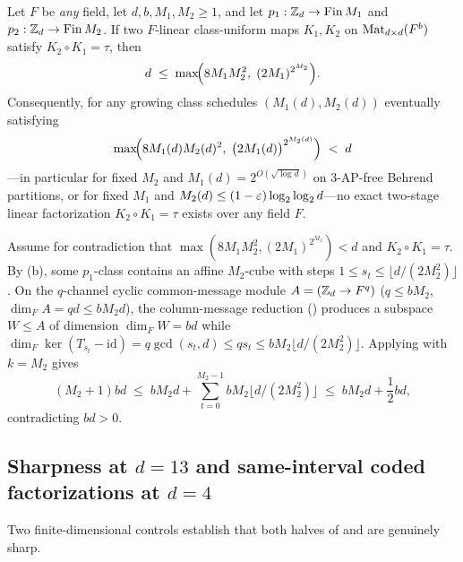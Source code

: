 \begin{theorem}\label{thm:2a}
Let $F$ be \emph{any} field, let $d, b, M_1, M_2 \ge 1$, and let
$p_1 : \mathbb{Z}_d \to \mathrm{Fin}\,M_1$ and $p_2 : \mathbb{Z}_d \to \mathrm{Fin}\,M_2$. If two $F$-linear
class-uniform maps $K_1, K_2$ on $\operatorname{Mat}_{d\times d}(F^b)$ satisfy $K_2 \circ K_1 = \tau$, then
\[
  d \;\le\; \max\!\Bigl(8 M_1 M_2^2,\; (2 M_1)^{2^{M_2}}\Bigr).
\]
Consequently, for any growing class schedules $(M_1(d), M_2(d))$ eventually satisfying
\[
  \max\!\Bigl(8 M_1(d) M_2(d)^2,\; \bigl(2 M_1(d)\bigr)^{2^{M_2(d)}}\Bigr) \;<\; d
\]
---in particular for fixed $M_2$
and $M_1(d) = 2^{O(\sqrt{\log d})}$ on $3$-AP-free Behrend partitions, or for fixed $M_1$ and
$M_2(d) \le (1 - \varepsilon)\log_2\log_2 d$---no exact two-stage linear factorization $K_2 \circ K_1 =
\tau$ exists over any field $F$.
\end{theorem}
\begin{outline}
Assume for contradiction that $\max(8M_1 M_2^2, (2M_1)^{2^{M_2}}) < d$ and $K_2 \circ K_1 = \tau$.
By (b), some $p_1$-class contains an affine $M_2$-cube with steps
$1 \le s_t \le \lfloor d/(2M_2^2)\rfloor$. On the $q$-channel cyclic common-message module
$A = (\mathbb{Z}_d \to F^q)$ ($q \le b M_2$, $\dim_F A = qd \le b M_2 d$), the column-message reduction
(\cite[Lemma~6.1 and Theorem~6.3]{SharedDecoders2026}) produces a subspace $W \le A$ of dimension
$\dim_F W = bd$
while $\dim_F\ker(T_{s_t} - \mathrm{id}) = q\gcd(s_t, d) \le q s_t \le b M_2 \lfloor d/(2M_2^2)\rfloor$.
Applying  with $k = M_2$ gives
\[
  (M_2 + 1) bd \;\le\; b M_2 d + \sum_{t=0}^{M_2 - 1} b M_2 \lfloor d/(2 M_2^2)\rfloor
  \;\le\; b M_2 d + \frac{1}{2} bd,
\]
contradicting $bd > 0$.
\end{outline}

\subsection{Sharpness at \texorpdfstring{$d = 13$}{d = 13} and same-interval coded factorizations at \texorpdfstring{$d = 4$}{d = 4}}\label{sec:cube-controls}

Two finite-dimensional controls establish that both halves of  and
 are genuinely sharp.

